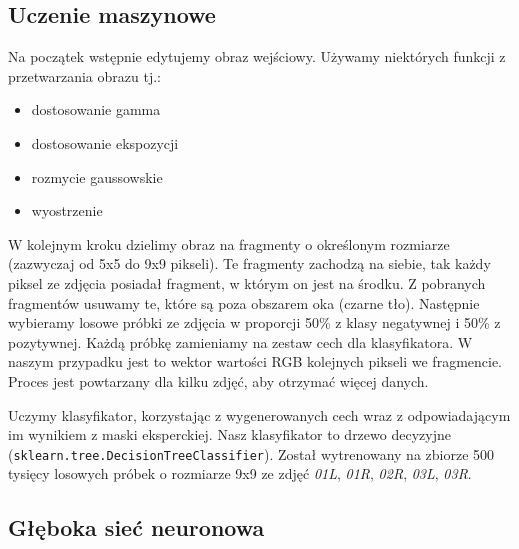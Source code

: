 \documentclass[polish,polish,a4paper]{article}
\begin{document}
		\subsection{Uczenie maszynowe}
			Na początek wstępnie edytujemy obraz wejściowy. Używamy niektórych funkcji z przetwarzania obrazu tj.:
			\begin{itemize}
				\item dostosowanie gamma
				\item dostosowanie ekspozycji
				\item rozmycie gaussowskie
				\item wyostrzenie
			\end{itemize}
			W kolejnym kroku dzielimy obraz na fragmenty o określonym rozmiarze (zazwyczaj od 5x5 do 9x9 pikseli).
			Te fragmenty zachodzą na siebie, tak każdy piksel ze zdjęcia posiadał fragment, w którym on jest na środku.
			Z pobranych fragmentów usuwamy te, które są poza obszarem oka (czarne tło).
			Następnie wybieramy losowe próbki ze zdjęcia w proporcji 50\% z klasy negatywnej i 50\% z pozytywnej.
			Każdą próbkę zamieniamy na zestaw cech dla klasyfikatora.
			W naszym przypadku jest to wektor wartości RGB kolejnych pikseli we fragmencie. 
			Proces jest powtarzany dla kilku zdjęć, aby otrzymać więcej danych.
			
			Uczymy klasyfikator, korzystając z wygenerowanych cech wraz z odpowiadającym im wynikiem z maski eksperckiej. 
			Nasz klasyfikator to drzewo decyzyjne (\texttt{sklearn.tree.DecisionTreeClassifier}).
			Został wytrenowany na zbiorze 500 tysięcy losowych próbek o rozmiarze 9x9 ze zdjęć 
			\textit{01L}, \textit{01R}, \textit{02R}, \textit{03L}, \textit{03R}.
		
		\subsection{Głęboka sieć neuronowa}
		
\end{document}
